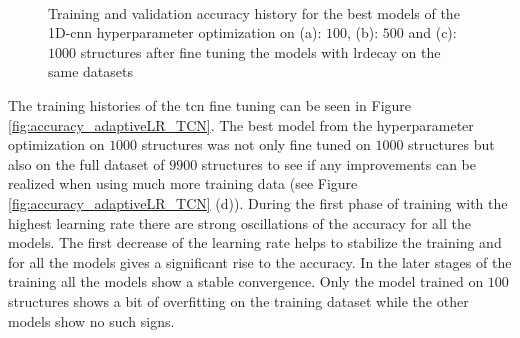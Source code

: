 \documentclass[conference]{IEEEtran}
\begin{document}
\begin{figure}[htp]
	\centering
	\quad
	\\
	\caption{Training and validation accuracy history for the best models of the 1D-\gls{cnn} hyperparameter optimization on (a): $ 100 $, (b): $ 500 $ and (c): $ 1000 $ structures after fine tuning the models with \gls{lrdecay} on the same datasets}
	\label{fig:accuracy_adaptiveLR_CNN}
\end{figure}

 The training histories of the \gls{tcn} fine tuning can be seen in Figure \ref{fig:accuracy_adaptiveLR_TCN}. The best model from the hyperparameter optimization on $ 1000 $ structures was not only fine tuned on $ 1000 $ structures but also on the full dataset of $ 9900 $ structures to see if any improvements can be realized when using much more training data (see Figure \ref{fig:accuracy_adaptiveLR_TCN} (d)). During the first phase of training with the highest learning rate there are strong oscillations of the accuracy for all the models. The first decrease of the learning rate helps to stabilize the training and for all the models gives a significant rise to the accuracy. In the later stages of the training all the models show a stable convergence. Only the model trained on $ 100 $ structures shows a bit of overfitting on the training dataset while the other models show no such signs. 
\end{document}
